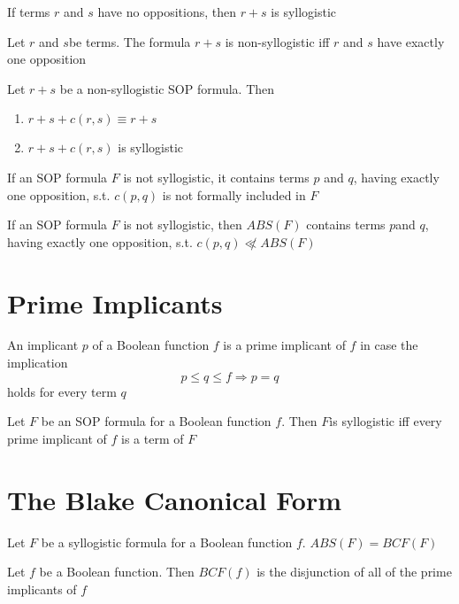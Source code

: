 \documentclass[11pt]{article}
\begin{document}
\begin{lemma}[]
If terms \(r\) and \(s\) have no oppositions, then \(r+s\) is syllogistic
\end{lemma}

\begin{theorem}[]
\label{thma-2-2}
Let \(r\) and \(s\)be terms. The formula \(r+s\) is non-syllogistic iff \(r\)
and \(s\) have exactly one opposition
\end{theorem}

\begin{lemma}[]
Let \(r+s\) be a non-syllogistic SOP formula. Then
\begin{enumerate}
\item \(r+s+c(r,s)\equiv r+s\)
\item \(r+s+c(r,s)\) is syllogistic
\end{enumerate}
\end{lemma}

\begin{theorem}[]
\label{thma-2-3}
If an SOP formula \(F\) is not syllogistic, it contains terms \(p\)
and \(q\), having exactly one opposition, s.t. \(c(p,q)\) is not formally
included in \(F\)
\end{theorem}

\begin{corollary}[]
If an SOP formula \(F\) is not syllogistic, then \(ABS(F)\) contains
terms \(p\)and \(q\), having  exactly one opposition, s.t. \(c(p,q)\not\ll ABS(F)\)
\end{corollary}

\section{Prime Implicants}
\label{sec:org7b95da6}
\begin{lemma}[]
An implicant \(p\) of a Boolean function \(f\) is a prime implicant of \(f\)
in case the implication
\begin{equation*}
p\le q\le f\Rightarrow p=q
\end{equation*}
holds for every term \(q\)
\end{lemma}

\begin{theorem}[]
Let \(F\) be an SOP formula for a Boolean function \(f\). Then \(F\)is
syllogistic iff every prime implicant of \(f\) is a term of \(F\)
\end{theorem}

\section{The Blake Canonical Form}
\label{sec:org091028d}
Let \(F\) be a syllogistic formula for a Boolean
function \(f\). \(ABS(F)=BCF(F)\)

\begin{theorem}[]
Let \(f\) be a Boolean function. Then \(BCF(f)\) is the disjunction of all of
the prime implicants of \(f\)
\end{theorem}
\end{document}
